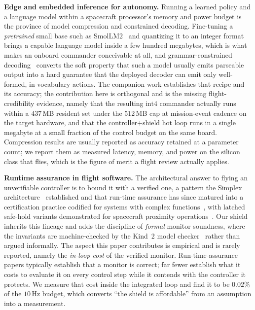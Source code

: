 \documentclass[journal]{IEEEtran}
\begin{document}
\noindent\textbf{Edge and embedded inference for autonomy.} Running a learned policy and a
language model within a spacecraft processor's memory and power budget is the province of model
compression and constrained decoding. Fine-tuning a \emph{pretrained} small base such as
SmolLM2~\cite{SmolLM2} and quantizing it to an integer format brings a capable language model
inside a few hundred megabytes, which is what makes an onboard commander conceivable at all, and
grammar-constrained decoding~\cite{Geng2023} converts the soft property that such a model usually
emits parseable output into a hard guarantee that the deployed decoder can emit only well-formed,
in-vocabulary actions. The companion work establishes that recipe and its accuracy; the
contribution here is orthogonal and is the missing flight-credibility evidence, namely that the
resulting int4 commander actually runs within a $437$\,MB resident set under the $512$\,MB cap at
mission-event cadence on the target hardware, and that the controller$+$shield hot loop runs in a
single megabyte at a small fraction of the control budget on the same board. Compression results
are usually reported as accuracy retained at a parameter count; we report them as measured
latency, memory, and power on the silicon class that flies, which is the figure of merit a flight
review actually applies.

\noindent\textbf{Runtime assurance in flight software.} The architectural answer to flying an
unverifiable controller is to bound it with a verified one, a pattern the Simplex
architecture~\cite{Sha2001} established and that run-time assurance has since matured into a
certification practice codified for systems with complex functions~\cite{ASTMF3269}, with latched
safe-hold variants demonstrated for spacecraft proximity operations~\cite{Dunlap2023}. Our shield
inherits this lineage and adds the discipline of \emph{formal} monitor soundness, where the
invariants are machine-checked by the Kind~2 model checker~\cite{Champion2016} rather than argued
informally. The aspect this paper contributes is empirical and is rarely reported, namely the
\emph{in-loop cost} of the verified monitor. Run-time-assurance papers typically establish that a
monitor is correct; far fewer establish what it costs to evaluate it on every control step while
it contends with the controller it protects. We measure that cost inside the integrated loop and
find it to be $0.02\%$ of the $10$\,Hz budget, which converts ``the shield is affordable'' from an
assumption into a measurement.
\end{document}
